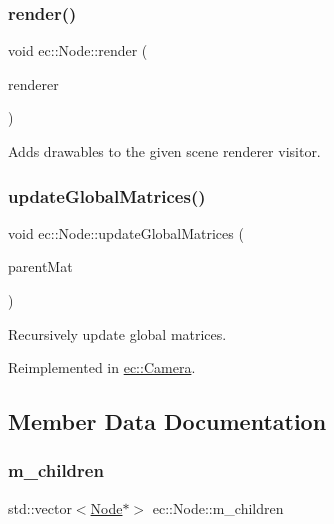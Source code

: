 \subsubsection{\texorpdfstring{render()}{render()}}
{\footnotesize\ttfamily void ec\+::\+Node\+::render (\begin{DoxyParamCaption}\item[{\mbox{\hyperlink{classec_1_1_scene_renderer}{Scene\+Renderer}} \&}]{renderer }\end{DoxyParamCaption})\hspace{0.3cm}{\ttfamily [virtual]}}



Adds drawables to the given scene renderer visitor. 

\mbox{\label{classec_1_1_node_a12a9b14ccc434c52404e262ef5db6f80}} 
\subsubsection{\texorpdfstring{update\+Global\+Matrices()}{updateGlobalMatrices()}}
{\footnotesize\ttfamily void ec\+::\+Node\+::update\+Global\+Matrices (\begin{DoxyParamCaption}\item[{const glm\+::mat4 \&}]{parent\+Mat }\end{DoxyParamCaption})\hspace{0.3cm}{\ttfamily [virtual]}}



Recursively update global matrices. 



Reimplemented in \mbox{\hyperlink{classec_1_1_camera_a1661dae4666cf50e697603904c96df6a}{ec\+::\+Camera}}.



\subsection{Member Data Documentation}
\mbox{\label{classec_1_1_node_a648e1758013c7fc5899cbff2f8fe41fa}} 
\subsubsection{\texorpdfstring{m\+\_\+children}{m\_children}}
{\footnotesize\ttfamily std\+::vector$<$\mbox{\hyperlink{classec_1_1_node}{Node}}$\ast$$>$ ec\+::\+Node\+::m\+\_\+children\hspace{0.3cm}{\ttfamily [protected]}}

